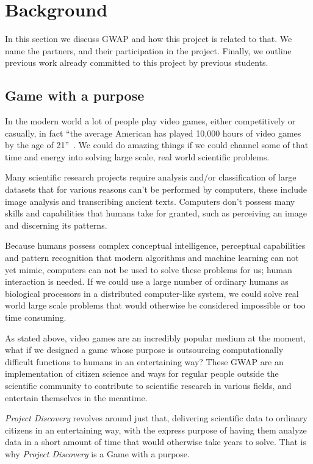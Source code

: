 \section{Background}\label{sec:background}
In this section we discuss GWAP and how this project is related to that. We name the partners, and their participation in the project. Finally, we outline previous work already committed to this project by previous students.

\subsection{Game with a purpose}
In the modern world a lot of people play video games, either competitively or casually, in fact ``the average American has played 10,000 hours of video games by the age of 21''~\cite{twitch}. We could do amazing things if we could channel some of that time and energy into solving large scale, real world scientific problems.

Many scientific research projects require analysis and/or classification of large datasets that for various reasons can't be performed by computers, these include image analysis and transcribing ancient texts. Computers don't possess many skills and capabilities that humans take for granted, such as perceiving an image and discerning its patterns.

Because humans possess complex conceptual intelligence, perceptual capabilities and pattern recognition that modern algorithms and machine learning can not yet mimic, computers can not be used to solve these problems for us; human interaction is needed. If we could use a large number of ordinary humans as biological processors in a distributed computer-like system, we could solve real world large scale problems that would otherwise be considered impossible or too time consuming.

As stated above, video games are an incredibly popular medium at the moment, what if we designed a game whose purpose is outsourcing computationally difficult functions to humans in an entertaining way? These GWAP are an implementation of citizen science and ways for regular people outside the scientific community to contribute to scientific research in various fields, and entertain themselves in the meantime.

\emph{Project Discovery} revolves around just that, delivering scientific data to ordinary citizens in an entertaining way, with the express purpose of having them analyze data in a short amount of time that would otherwise take years to solve. That is why \emph{Project Discovery} is a Game with a purpose.

